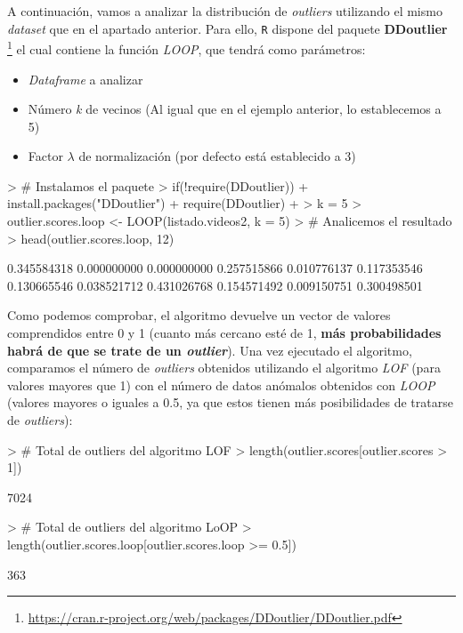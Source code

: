 \documentclass [a4paper] {article}
\begin{document}
A continuación, vamos a analizar la distribución de \textit{outliers} utilizando el mismo \textit{dataset} que en el apartado anterior. Para ello, \texttt{R} dispone del paquete \textbf{DDoutlier} \footnote{\url{https://cran.r-project.org/web/packages/DDoutlier/DDoutlier.pdf}} el cual contiene la función \textit{LOOP}, que tendrá como parámetros:
\begin{itemize}
  \item \textit{Dataframe} a analizar
  \item Número \textit{k} de vecinos (Al igual que en el ejemplo anterior, lo establecemos a 5)
  \item Factor $\lambda$ de normalización (por defecto está establecido a 3)
\end{itemize}
{\footnotesize
\begin{Schunk}
\begin{Sinput}
> # Instalamos el paquete
> if(!require(DDoutlier)){
+   install.packages("DDoutlier")
+   require(DDoutlier)
+ }
> k = 5
> outlier.scores.loop <- LOOP(listado.videos2, k = 5)
> # Analicemos el resultado
> head(outlier.scores.loop, 12)
\end{Sinput}
\begin{Soutput}
 [1] 0.345584318 0.000000000 0.000000000 0.257515866 0.010776137 0.117353546 0.130665546 0.038521712 0.431026768 0.154571492 0.009150751 0.300498501
\end{Soutput}
\end{Schunk}
}
Como podemos comprobar, el algoritmo devuelve un vector de valores comprendidos entre 0 y 1 (cuanto más cercano esté de 1, \textbf{más probabilidades habrá de que se trate de un \textit{outlier}}).
Una vez ejecutado el algoritmo, comparamos el número de \textit{outliers} obtenidos utilizando el algoritmo \textit{LOF} (para valores mayores que 1) con el número de datos anómalos obtenidos con \textit{LOOP} (valores mayores o iguales a 0.5, ya que estos tienen más posibilidades de tratarse de \textit{outliers}):
\begin{Schunk}
\begin{Sinput}
> # Total de outliers del algoritmo LOF
> length(outlier.scores[outlier.scores > 1])
\end{Sinput}
\begin{Soutput}
[1] 7024
\end{Soutput}
\begin{Sinput}
> # Total de outliers del algoritmo LoOP
> length(outlier.scores.loop[outlier.scores.loop >= 0.5])
\end{Sinput}
\begin{Soutput}
[1] 363
\end{Soutput}
\end{Schunk}
\end{document}
